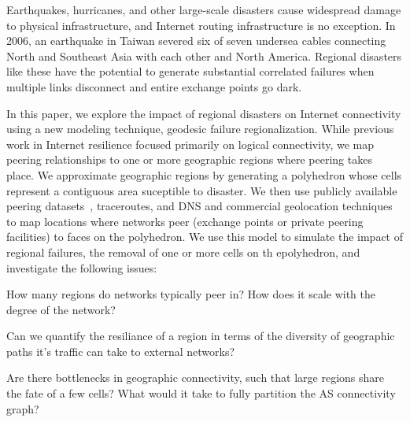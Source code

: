 

Earthquakes, hurricanes, and other large-scale disasters cause widespread damage
to physical infrastructure, and Internet routing infrastructure is no exception.
In 2006, an earthquake in Taiwan severed six of seven 
undersea cables connecting North and Southeast Asia with each other and North 
America. 
Regional disasters like these have the potential to generate substantial 
correlated failures when multiple links disconnect and entire exchange points
go dark.


In this paper, we explore the impact of regional disasters on Internet
connectivity using a new modeling technique, geodesic failure regionalization.
While previous work in Internet resilience focused primarily on logical
connectivity, we map peering relationships to one or more geographic regions
where peering takes place.  We approximate geographic regions by generating a
polyhedron whose cells represent a contiguous area suceptible to disaster.  We
then use publicly available peering datasets~\cite{ixps-mapped, peeringdb},
traceroutes, and DNS and commercial geolocation techniques to map locations
where networks peer (exchange points or private peering facilities) to faces on
the polyhedron.  We use this model to simulate the impact of regional failures,
\ie{} the removal of one or more cells on th epolyhedron, and investigate the following issues:

 How many regions do networks
typically peer in? How does it scale with the degree of the network?

 Can we quantify the resiliance of a
region in terms of the diversity of geographic paths it's traffic can take to external networks?

 Are there bottlenecks in geographic connectivity, such that large regions share the fate of a few cells?
    What would it take to fully partition the AS connectivity graph?

